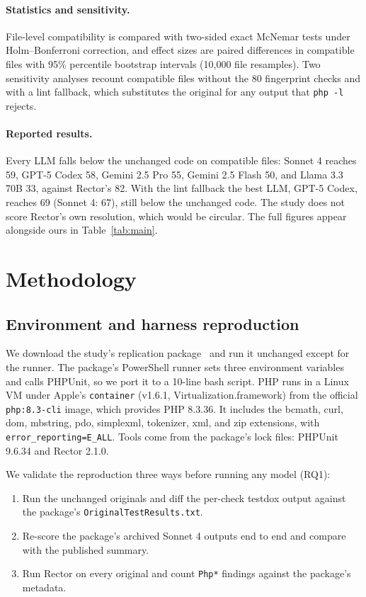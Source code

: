 \documentclass[11pt]{article}
\newcommand{\code}[1]{\texttt{#1}}
\begin{document}
\paragraph{Statistics and sensitivity.}
File-level compatibility is compared with two-sided exact McNemar tests under Holm--Bonferroni correction, and effect sizes are paired differences in compatible files with 95\% percentile bootstrap intervals (10,000 file resamples).
Two sensitivity analyses recount compatible files without the 80 fingerprint checks and with a lint fallback, which substitutes the original for any output that \code{php -l} rejects.

\paragraph{Reported results.}
Every LLM falls below the unchanged code on compatible files: Sonnet 4 reaches 59, GPT-5 Codex 58, Gemini 2.5 Pro 55, Gemini 2.5 Flash 50, and Llama 3.3 70B 33, against Rector's 82.
With the lint fallback the best LLM, GPT-5 Codex, reaches 69 (Sonnet 4: 67), still below the unchanged code.
The study does not score Rector's own resolution, which would be circular.
The full figures appear alongside ours in Table~\ref{tab:main}.

\section{Methodology}

\subsection{Environment and harness reproduction}

We download the study's replication package~\cite{mahmud2026package} and run it unchanged except for the runner.
The package's PowerShell runner sets three environment variables and calls PHPUnit, so we port it to a 10-line bash script.
PHP runs in a Linux VM under Apple's \code{container} (v1.6.1, Virtualization.framework) from the official \code{php:8.3-cli} image, which provides PHP 8.3.36.
It includes the bcmath, curl, dom, mbstring, pdo, simplexml, tokenizer, xml, and zip extensions, with \code{error\_reporting=E\_ALL}.
Tools come from the package's lock files: PHPUnit 9.6.34 and Rector 2.1.0.

We validate the reproduction three ways before running any model (RQ1):
\begin{enumerate}
  \item Run the unchanged originals and diff the per-check testdox output against the package's \code{OriginalTestResults.txt}.
  \item Re-score the package's archived Sonnet 4 outputs end to end and compare with the published summary.
  \item Run Rector on every original and count \code{Php*} findings against the package's metadata.
\end{enumerate}
\end{document}
